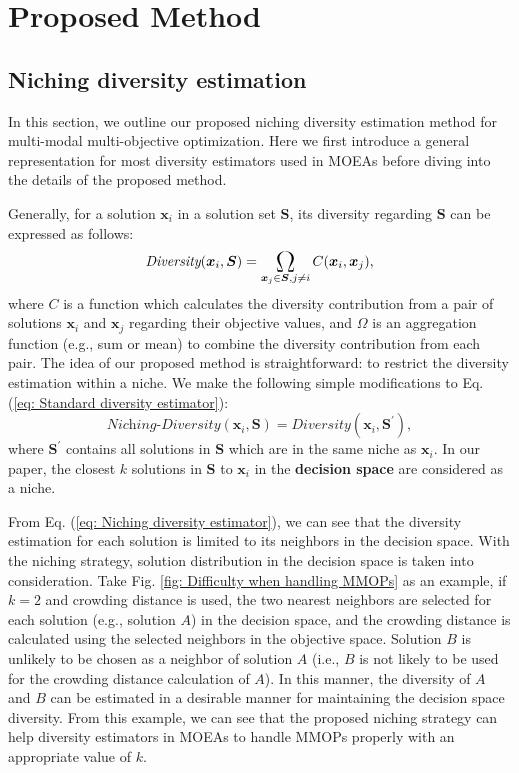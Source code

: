 \section{Proposed Method}
\label{sec: Proposed method}
\subsection{Niching diversity estimation}
In this section, we outline our proposed niching diversity estimation method for multi-modal multi-objective optimization. Here we first introduce a general representation for most diversity estimators used in MOEAs before diving into the details of the proposed method.

Generally, for a solution $\boldsymbol{x}_i$ in a solution set $\boldsymbol{S}$, its diversity regarding $\boldsymbol{S}$ can be expressed as follows:
\begin{equation}
	\textit{Diversity}(\boldsymbol{x}_i, \boldsymbol{S}) = \mathop{\bigdelta}_{\boldsymbol{x}_j\in\boldsymbol{S}, j \neq i}{C(\boldsymbol{x}_i, \boldsymbol{x}_j)},
	\label{eq: Standard diversity estimator}
\end{equation}
where $C$ is a function which calculates the diversity contribution from a pair of solutions $\boldsymbol{x}_i$ and $\boldsymbol{x}_j$ regarding their objective values, and $\Omega$ is an aggregation function (e.g., sum or mean) to combine the diversity contribution from each pair.
The idea of our proposed method is straightforward: to restrict the diversity estimation within a niche. We make the following simple modifications to Eq. (\ref{eq: Standard diversity estimator}):
\begin{equation}
	\textit{Niching-Diversity}(\boldsymbol{x}_i, \boldsymbol{S}) = \textit{Diversity}(\boldsymbol{x}_i, \boldsymbol{S}^\prime),
	\label{eq: Niching diversity estimator}
\end{equation}
where $\boldsymbol{S}^\prime$ contains all solutions in $\boldsymbol{S}$ which are in the same niche as $\boldsymbol{x}_i$. In our paper, the closest $k$ solutions in $\boldsymbol{S}$ to $\boldsymbol{x}_i$ in the \textbf{decision space} are considered as a niche.

From Eq. (\ref{eq: Niching diversity estimator}), we can see that the diversity estimation for each solution is limited to its neighbors in the decision space. With the niching strategy, solution distribution in the decision space is taken into consideration. Take Fig. \ref{fig: Difficulty when handling MMOPs} as an example, if $k = 2$ and crowding distance is used, the two nearest neighbors are selected for each solution (e.g., solution $A$) in the decision space, and the crowding distance is calculated using the selected neighbors in the objective space. Solution $B$ is unlikely to be chosen as a neighbor of solution $A$ (i.e., $B$ is not likely to be used for the crowding distance calculation of $A$). In this manner, the diversity of $A$ and $B$ can be estimated in a desirable manner for maintaining the decision space diversity. From this example, we can see that the proposed niching strategy can help diversity estimators in MOEAs to handle MMOPs properly with an appropriate value of $k$.

